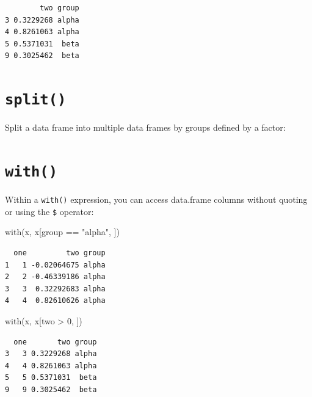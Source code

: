 \documentclass[
]{book}
\newenvironment{Shaded}{\begin{snugshade}}{\end{snugshade}}
\newcommand{\DecValTok}[1]{\textcolor[rgb]{0.00,0.00,0.81}{#1}}
\newcommand{\FunctionTok}[1]{\textcolor[rgb]{0.00,0.00,0.00}{#1}}
\newcommand{\NormalTok}[1]{#1}
\newcommand{\OtherTok}[1]{\textcolor[rgb]{0.56,0.35,0.01}{#1}}
\newcommand{\SpecialCharTok}[1]{\textcolor[rgb]{0.00,0.00,0.00}{#1}}
\newcommand{\StringTok}[1]{\textcolor[rgb]{0.31,0.60,0.02}{#1}}
\begin{document}
\begin{verbatim}
        two group
3 0.3229268 alpha
4 0.8261063 alpha
5 0.5371031  beta
9 0.3025462  beta
\end{verbatim}

\hypertarget{split}{%
\section{\texorpdfstring{\texttt{split()}}{split()}}\label{split}}

Split a data frame into multiple data frames by groups defined by a factor:

\begin{Shaded}
\end{Shaded}

\hypertarget{with}{%
\section{\texorpdfstring{\texttt{with()}}{with()}}\label{with}}

Within a \texttt{with()} expression, you can access data.frame columns without quoting or using the \texttt{\$} operator:

\begin{Shaded}
\begin{Highlighting}[]
\FunctionTok{with}\NormalTok{(x, x[group }\SpecialCharTok{==} \StringTok{"alpha"}\NormalTok{, ])}
\end{Highlighting}
\end{Shaded}

\begin{verbatim}
  one         two group
1   1 -0.02064675 alpha
2   2 -0.46339186 alpha
3   3  0.32292683 alpha
4   4  0.82610626 alpha
\end{verbatim}

\begin{Shaded}
\begin{Highlighting}[]
\FunctionTok{with}\NormalTok{(x, x[two }\SpecialCharTok{\textgreater{}} \DecValTok{0}\NormalTok{, ])}
\end{Highlighting}
\end{Shaded}

\begin{verbatim}
  one       two group
3   3 0.3229268 alpha
4   4 0.8261063 alpha
5   5 0.5371031  beta
9   9 0.3025462  beta
\end{verbatim}
\end{document}

